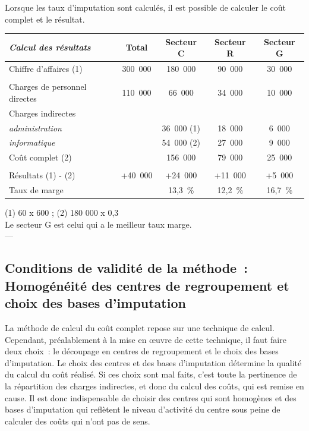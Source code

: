 \documentclass{kaobook}
\begin{document}
Lorsque les taux d'imputation sont calculés, il est possible de calculer le coût complet et le résultat.\\
\begin{center}
\begin{tabular}{l c c c c}
\emph{Calcul des résultats} & Total & Secteur C & Secteur R & Secteur G\\
\hline
Chiffre d'affaires (1) & 300 000 & 180 000 & 90 000 & 30 000\\
 &  &  &  & \\
Charges de personnel directes & 110 000 & 66 000 & 34 000 & 10 000\\
Charges indirectes &  &  &  & \\
\emph{administration} &  & 36 000 (1) & 18 000 & 6 000\\
\emph{informatique} &  & 54 000 (2) & 27 000 & 9 000\\
Coût complet (2) &  & 156 000 & 79 000 & 25 000\\
 &  &  &  & \\
Résultats (1) - (2) & +40 000 & +24 000 & +11 000 & +5 000\\
Taux de marge &  & 13,3 \% & 12,2 \% & 16,7 \%\\
\end{tabular}
\end{center}
(1) 60 x 600 ; (2) 180 000 x 0,3\\
Le secteur G est celui qui a le meilleur taux marge.\\
---\\

\subsection{Conditions de validité de la méthode : Homogénéité des centres de regroupement et choix des bases d'imputation}
\label{sec:orgf636878}
La méthode de calcul du coût complet repose sur une technique de calcul. Cependant, préalablement à la mise en œuvre de cette technique, il faut faire deux choix : le découpage en centres de regroupement et le choix des bases d'imputation. Le choix des centres et des bases d'imputation détermine la qualité du calcul du coût réalisé. Si ces choix sont mal faits, c'est toute la pertinence de la répartition des charges indirectes, et donc du calcul des coûts, qui est remise en cause. Il est donc indispensable de choisir des centres qui sont homogènes et des bases d'imputation qui reflètent le niveau d'activité du centre sous peine de calculer des coûts qui n'ont pas de sens.\\
\end{document}
